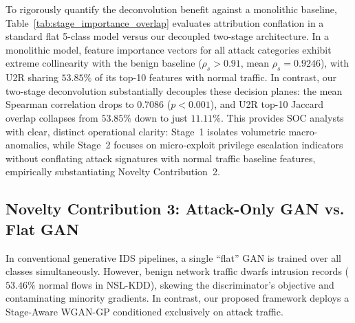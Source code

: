 \documentclass[journal]{IEEEtran}
\begin{document}
\begin{table}[htbp]
\centering
\small
\caption{Empirical Feature Attribution Deconvolution: Comparing Monolithic Single-Stage vs. Two-Stage Stage-Wise Attribution Overlap Against Benign/Stage~1 Baselines.}
\label{tab:stage_importance_overlap}
\end{table}

To rigorously quantify the deconvolution benefit against a monolithic baseline, Table~\ref{tab:stage_importance_overlap} evaluates attribution conflation in a standard flat 5-class model versus our decoupled two-stage architecture. In a monolithic model, feature importance vectors for all attack categories exhibit extreme collinearity with the benign baseline ($\rho_s > 0.91$, mean $\rho_s = 0.9246$), with U2R sharing $53.85\%$ of its top-10 features with normal traffic. In contrast, our two-stage deconvolution substantially decouples these decision planes: the mean Spearman correlation drops to $0.7086$ ($p < 0.001$), and U2R top-10 Jaccard overlap collapses from $53.85\%$ down to just $\mathbf{11.11\%}$. This provides SOC analysts with clear, distinct operational clarity: Stage~1 isolates volumetric macro-anomalies, while Stage~2 focuses on micro-exploit privilege escalation indicators without conflating attack signatures with normal traffic baseline features, empirically substantiating Novelty Contribution~2.

\subsection{Novelty Contribution 3: Attack-Only GAN vs. Flat GAN}
In conventional generative IDS pipelines, a single ``flat'' GAN is trained over all classes simultaneously. However, benign network traffic dwarfs intrusion records ($53.46\%$ normal flows in NSL-KDD), skewing the discriminator's objective and contaminating minority gradients. In contrast, our proposed framework deploys a Stage-Aware WGAN-GP conditioned exclusively on attack traffic.
\end{document}
